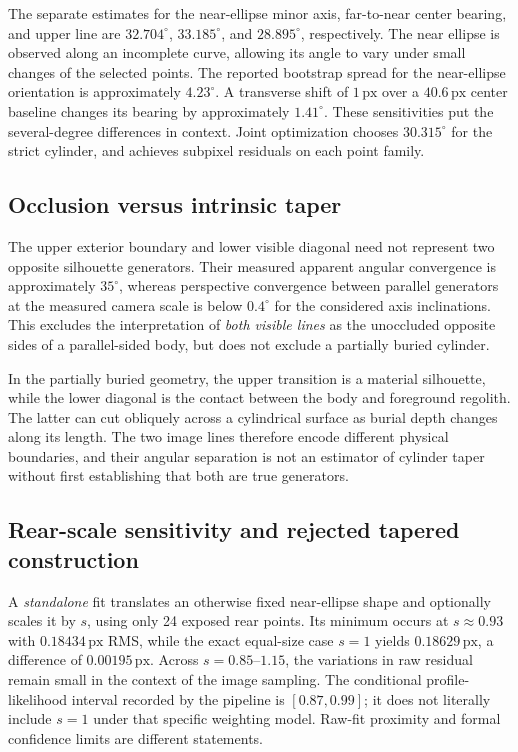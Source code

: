 \documentclass[11pt,letterpaper]{article}
\newcommand{\px}{\,\mathrm{px}}
\begin{document}
The separate estimates for the near-ellipse minor axis, far-to-near center bearing, and upper line are \(32.704^\circ\), \(33.185^\circ\), and \(28.895^\circ\), respectively. The near ellipse is observed along an incomplete curve, allowing its angle to vary under small changes of the selected points. The reported bootstrap spread for the near-ellipse orientation is approximately \(4.23^\circ\). A transverse shift of \(1\px\) over a \(40.6\px\) center baseline changes its bearing by approximately \(1.41^\circ\). These sensitivities put the several-degree differences in context. Joint optimization chooses \(30.315^\circ\) for the strict cylinder, and achieves subpixel residuals on each point family.

\subsection{Occlusion versus intrinsic taper}

The upper exterior boundary and lower visible diagonal need not represent two opposite silhouette generators. Their measured apparent angular convergence is approximately $35^\circ$, whereas perspective convergence between parallel generators at the measured camera scale is below $0.4^\circ$ for the considered axis inclinations. This excludes the interpretation of \emph{both visible lines} as the unoccluded opposite sides of a parallel-sided body, but does not exclude a partially buried cylinder.

In the partially buried geometry, the upper transition is a material silhouette, while the lower diagonal is the contact between the body and foreground regolith. The latter can cut obliquely across a cylindrical surface as burial depth changes along its length. The two image lines therefore encode different physical boundaries, and their angular separation is not an estimator of cylinder taper without first establishing that both are true generators.

\subsection{Rear-scale sensitivity and rejected tapered construction}
\label{sec:taper}

A \emph{standalone} fit translates an otherwise fixed near-ellipse shape and optionally scales it by \(s\), using only 24 exposed rear points. Its minimum occurs at \(s\approx0.93\) with \(0.18434\px\) RMS, while the exact equal-size case \(s=1\) yields \(0.18629\px\), a difference of \(0.00195\px\). Across \(s=0.85\)--\(1.15\), the variations in raw residual remain small in the context of the image sampling. The conditional profile-likelihood interval recorded by the pipeline is \([0.87,0.99]\); it does not literally include \(s=1\) under that specific weighting model. Raw-fit proximity and formal confidence limits are different statements.
\end{document}
